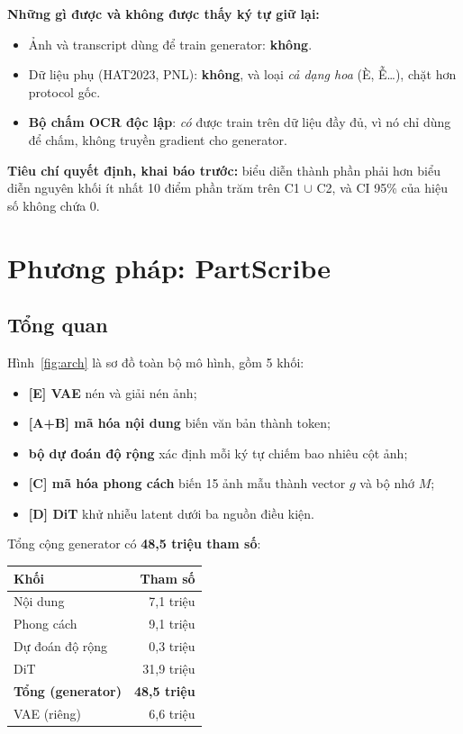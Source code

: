 \documentclass[11pt,a4paper]{article}
\begin{document}
\textbf{Những gì được và không được thấy ký tự giữ lại:}
\begin{itemize}
\item Ảnh và transcript dùng để train generator: \textbf{không}.
\item Dữ liệu phụ (HAT2023, PNL): \textbf{không}, và loại \emph{cả dạng hoa} (È, Ễ\dots), chặt hơn protocol gốc.
\item \textbf{Bộ chấm OCR độc lập}: \emph{có} được train trên dữ liệu đầy đủ, vì nó chỉ dùng để chấm, không truyền gradient cho generator.
\end{itemize}

\textbf{Tiêu chí quyết định, khai báo trước:} biểu diễn thành phần phải hơn biểu diễn nguyên khối ít nhất 10 điểm phần trăm trên C1 $\cup$ C2, và CI 95\% của hiệu số không chứa 0.

\section{Phương pháp: PartScribe}
\label{sec:method}

\subsection{Tổng quan}
Hình~\ref{fig:arch} là sơ đồ toàn bộ mô hình, gồm 5 khối:
\begin{itemize}
\item \textbf{[E] VAE} nén và giải nén ảnh;
\item \textbf{[A+B] mã hóa nội dung} biến văn bản thành token;
\item \textbf{bộ dự đoán độ rộng} xác định mỗi ký tự chiếm bao nhiêu cột ảnh;
\item \textbf{[C] mã hóa phong cách} biến 15 ảnh mẫu thành vector $g$ và bộ nhớ $M$;
\item \textbf{[D] DiT} khử nhiễu latent dưới ba nguồn điều kiện.
\end{itemize}
Tổng cộng generator có \textbf{48,5 triệu tham số}:

\begin{center}\small
\begin{tabular}{lr}
\toprule
Khối & Tham số \\
\midrule
Nội dung & 7,1 triệu \\
Phong cách & 9,1 triệu \\
Dự đoán độ rộng & 0,3 triệu \\
DiT & 31,9 triệu \\
\midrule
\textbf{Tổng (generator)} & \textbf{48,5 triệu} \\
VAE (riêng) & 6,6 triệu \\
\bottomrule
\end{tabular}
\end{center}
\end{document}
